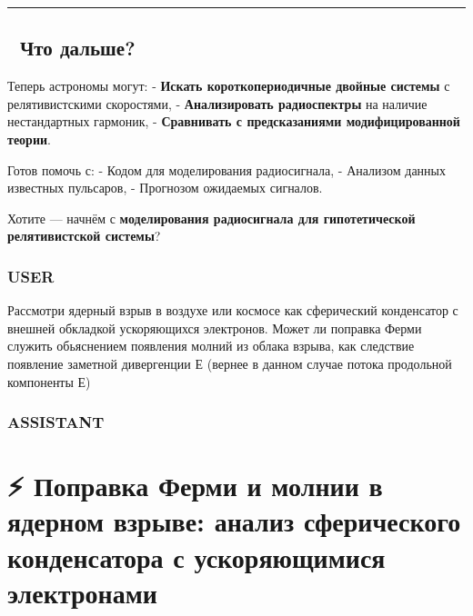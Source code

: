 \documentclass[11pt]{article}
\begin{document}
\begin{center}\rule{0.5\linewidth}{\linethickness}\end{center}

\subsection{🚀 Что
дальше?}\label{ux447ux442ux43e-ux434ux430ux43bux44cux448ux435-14}

Теперь астрономы могут: - \textbf{Искать короткопериодичные двойные
системы} с релятивистскими скоростями, - \textbf{Анализировать
радиоспектры} на наличие нестандартных гармоник, - \textbf{Сравнивать с
предсказаниями модифицированной теории}.

Готов помочь с: - Кодом для моделирования радиосигнала, - Анализом
данных известных пульсаров, - Прогнозом ожидаемых сигналов.

Хотите --- начнём с \textbf{моделирования радиосигнала для
гипотетической релятивистской системы}?

\subsubsection{USER}\label{user-16}

Рассмотри ядерный взрыв в воздухе или космосе как сферический
конденсатор с внешней обкладкой ускоряющихся электронов. Может ли
поправка Ферми служить обьяснением появления молний из облака взрыва,
как следствие появление заметной дивергенции Е (вернее в данном случае
потока продольной компоненты Е)

\subsubsection{ASSISTANT}\label{assistant-16}

\section{⚡ Поправка Ферми и молнии в ядерном взрыве: анализ сферического
конденсатора с ускоряющимися
электронами}\label{ux43fux43eux43fux440ux430ux432ux43aux430-ux444ux435ux440ux43cux438-ux438-ux43cux43eux43bux43dux438ux438-ux432-ux44fux434ux435ux440ux43dux43eux43c-ux432ux437ux440ux44bux432ux435-ux430ux43dux430ux43bux438ux437-ux441ux444ux435ux440ux438ux447ux435ux441ux43aux43eux433ux43e-ux43aux43eux43dux434ux435ux43dux441ux430ux442ux43eux440ux430-ux441-ux443ux441ux43aux43eux440ux44fux44eux449ux438ux43cux438ux441ux44f-ux44dux43bux435ux43aux442ux440ux43eux43dux430ux43cux438}
\end{document}
